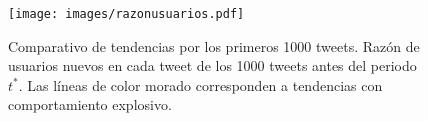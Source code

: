 \documentclass[../main.tex]{subfiles}
\begin{document}
 
 \begin{figure}[!h]
    \centering
    \texttt{[image: images/razonusuarios.pdf]}
    \caption{ Comparativo de tendencias por los primeros 1000 tweets. Razón de usuarios nuevos en cada tweet de los 1000 tweets antes del periodo $t^{*}$. Las líneas de color morado corresponden a tendencias con comportamiento explosivo.  } 
    \label{fig:resultados_1000Tweets}
\end{figure}
 

\end{document}
